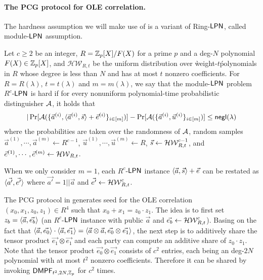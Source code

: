 \paragraph{The PCG protocol for OLE correlation.}The hardness assumption we will make use of is a variant of Ring-${\sf LPN}$, called module-${\sf LPN}$ assumption. 
\begin{definition}\label{def:module-LPN}
    Let $c\ge 2$ be an integer, $R = \mathbb{Z}_p[X]/F(X)$ for a prime $p$ and a deg-$N$ polynomial $F(X)\in \mathbb{Z}_p[X]$, and $\mathcal{HW}_{R,t}$ be the uniform distribution over \`weight-$t$\' polynomials in $R$ whose degree is less than $N$ and has at most $t$ nonzero coefficients. 
     For $R=R(\lambda)$, $t=t(\lambda)$ and $m=m(\lambda)$, we say that the module-${\sf LPN}$ problem $R^c$-${\sf LPN}$ is hard if for every nonuniform polynomial-time probabilistic distinguisher $\mathcal{A}$, it holds that 
    \[
        |\Pr[\mathcal{A}(\{\vec{a}^{(i)}, \langle \vec{a}^{(i)}, \vec{s} \rangle+\vec{e}^{(i)}\}_{i\in [m]})] - \Pr[\mathcal{A}(\{\vec{a}^{(i)},\vec{u}^{(i)}\}_{i\in [m]})] \le \mathsf{negl}(\lambda)
    \]
    where the probabilities are taken over the randomness of $\mathcal{A}$, random samples $\vec{a}^{(1)},\cdots, \vec{a}^{(m)}\leftarrow R^{c-1}$, $\vec{u}^{(1)},\cdots, \vec{u}^{(m)}\leftarrow R$, $\vec{s}\leftarrow \mathcal{HW}_{R,t}^{c-1}$, and $\vec{e}^{(1)},\cdots, \vec{e}^{(m)}\leftarrow \mathcal{HW}_{R,t}$. 

    When we only consider $m=1$, each $R^c$-${\sf LPN}$ instance $ \langle \vec{a}, \vec{s} \rangle+\vec{e}$ can be restated as $\langle \vec{a'}, \vec{e'} \rangle$ where $\vec{a'}=1||\vec{a}$ and $\vec{e'}\leftarrow \mathcal{HW}_{R,t}^c$. 
\end{definition}

The PCG protocol in \cite{cryptoeprint:2022/1035} generates seed for the OLE correlation $(x_0,x_1,z_0,z_1)\in R^4$ such that $x_0+x_1 = z_0\cdot z_1$. The idea is to first set $z_b = \langle \vec{a}, \vec{e_b} \rangle$ (an $R^c$-${\sf LPN}$ instance with public $\vec{a}$ and $\vec{e_b}\leftarrow \mathcal{HW}_{R,t}^c$). Basing on the fact that $\langle \vec{a},  \vec{e_0} \rangle\cdot \langle \vec{a}, \vec{e_1} \rangle = \langle \vec{a}\otimes \vec{a}, \vec{e_0}\otimes \vec{e_1} \rangle$, the next step is to additively share the tensor product $\vec{e_1}\otimes \vec{e_1}$ and each party can compute an additive share of $z_0\cdot z_1$. Note that the tensor product $\vec{e_0}\otimes\vec{e_1}$ consists of $c^2$ entries, each being an deg-$2N$ polynomial with at most $t^2$ nonzero coefficients. Therefore it can be shared by invoking ${\sf DMPF}_{t^2, 2N, \mathbb{Z}_p}$ for $c^2$ times.

